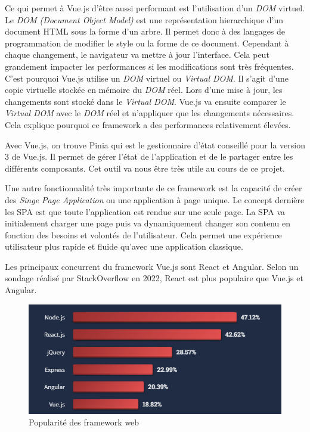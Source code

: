 Ce qui permet à Vue.js d'être aussi performant est l'utilisation d'un \emph{DOM} virtuel. Le \emph{DOM (Document Object Model)} est une représentation hierarchique d'un document HTML sous la forme d'un arbre. Il permet donc à des langages de programmation de modifier le style ou la forme de ce document. Cependant à chaque changement, le navigateur va mettre à jour l'interface. Cela peut grandement impacter les performances si les modifications sont très fréquentes. C'est pourquoi Vue.js utilise un \emph{DOM} virtuel ou \emph{Virtual DOM}. Il s'agit d'une copie virtuelle stockée en mémoire du \emph{DOM} réel. Lors d'une mise à jour, les changements sont stocké dans le \emph{Virtual DOM}. Vue.js va ensuite comparer le \emph{Virtual DOM} avec le \emph{DOM} réel et n'appliquer que les changements nécessaires. Cela explique pourquoi ce framework a des performances relativement élevées.

Avec Vue.js, on trouve Pinia qui est le gestionnaire d'état conseillé pour la version 3 de Vue.js. Il permet de gérer l'état de l'application et de le partager entre les différents composants. Cet outil va nous être très utile au cours de ce projet.

Une autre fonctionnalité très importante de ce framework est la capacité de créer des \emph{Singe Page Application} ou une application à page unique. Le concept dernière les SPA est que toute l'application est rendue sur une seule page. La SPA va initialement charger une page puis va dynamiquement changer son contenu en fonction des besoins et volontés de l'utilisateur. Cela permet une expérience utilisateur plus rapide et fluide qu'avec une application classique.

Les principaux concurrent du framework Vue.js sont React et Angular. Selon un sondage réalisé par StackOverflow \cite{StackoverflowSurvey} en 2022, React est plus populaire que Vue.js et Angular.
\begin{center}
    \begin{figure}[H]%
        \includegraphics[width=\textwidth]{./assets/figures/VueVSReactVSAngular.png}
        \caption{Popularité des framework web \label{VueVSReactVSAngular.png}}
    \end{figure}
\end{center}


